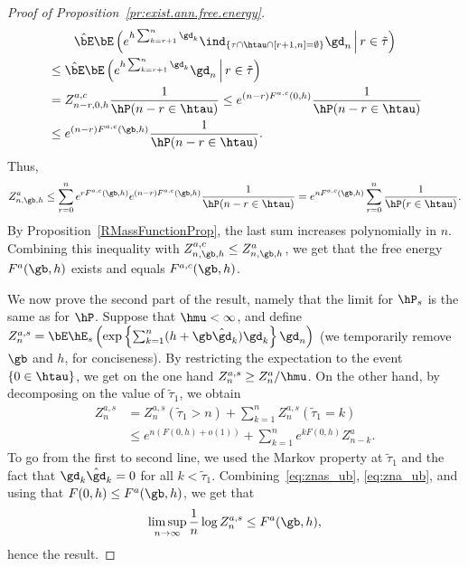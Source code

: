 \begin{proof}[Proof of Proposition~\ref{pr:exist.ann.free.energy}]
\begin{multline}
\hat \bE \bE \left(e^{h \sum_{k=r+1}^n \gd_k} \ind_{\{\tau \cap \htau \cap [r+1,n] = \emptyset\}} \gd_n \,\middle|\, r \in \tilde\tau \right)\\
\begin{aligned}
&\leq \hat \bE \bE \left(e^{h \sum_{k=r+1}^n \gd_k} \gd_n \,\middle|\, r \in \tilde\tau \right)\\
&= Z^{a,c}_{n-r,0,h} \frac{1}{\hP(n - r \in \htau)} \leq e^{(n - r) F^{a,c}(0,h)} \frac{1}{\hP(n - r \in \htau)}\\
&\leq e^{(n - r)F^{a,c}(\gb,h)} \frac{1}{\hP(n - r \in \htau)}.
\end{aligned}
\end{multline}
Thus,
\begin{equation}\label{eq:zna_ub}
Z^a_{n,\gb,h} \leq \sum_{r=0}^n e^{r F^{a,c}(\gb,h)} e^{(n - r) F^{a,c}(\gb,h)} \frac{1}{\hP(n - r \in \htau)} = e^{n F^{a,c}(\gb,h)} \sum_{r=0}^n \frac{1}{\hP(r \in \htau)}.
\end{equation}
By Proposition~\ref{RMassFunctionProp}, the last sum increases polynomially in $n$. Combining this inequality with $Z^{a,c}_{n,\gb,h} \leq Z^a_{n,\gb,h}$, we get that the free energy $F^a(\gb,h)$ exists and equals $F^{a,c}(\gb,h)$.

We now prove the second part of the result, namely that the limit for $\hP_s$ is the same as for $\hP$. Suppose that $\hmu < \infty$, and define $Z_n^{a,s} = \bE \hE_s \left(\exp \left\{ \sum_{k=1}^n (h + \gb \hat \gd_k) \gd_k \right\} \gd_n \right)$ (we temporarily remove $\gb$ and $h$, for conciseness). By restricting the expectation to the event $\{0 \in \htau\}$, we get on the one hand $Z_n^{a,s} \geq Z_n^a / \hmu$. On the other hand, by decomposing on the value of $\tilde\tau_1$, we obtain
\begin{equation}\label{eq:znas_ub}
\begin{aligned}
Z_n^{a,s} &= Z_n^{a,s}(\tilde\tau_1 > n) + \sum_{k=1}^n Z_n^{a,s}(\tilde\tau_1 = k)\\
&\leq e^{n (F(0,h) + o(1))} + \sum_{k=1}^n e^{k F(0,h)} Z^a_{n - k}.
\end{aligned}
\end{equation}
To go from the first to second line, we used the Markov property at $\tilde\tau_1$ and the fact that $\gd_k \hat \gd_k = 0$ for all $k < \tilde\tau_1$. Combining~\eqref{eq:znas_ub}, \eqref{eq:zna_ub}, and using that $F(0,h) \leq F^a(\gb,h)$, we get that
\begin{equation}
\limsup_{n \to \infty} \frac{1}{n} \log Z_n^{a,s} \leq F^a(\gb,h),
\end{equation}
hence the result.
\end{proof}

